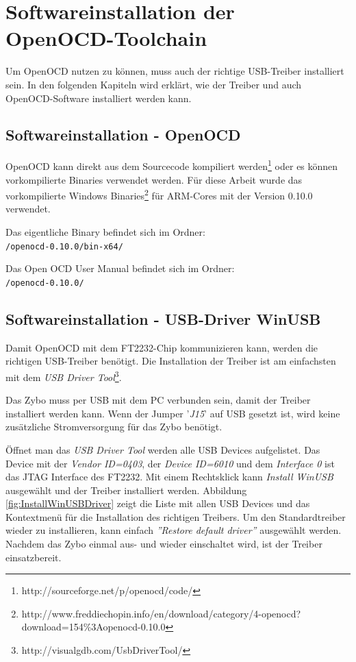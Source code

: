 \section{Softwareinstallation der OpenOCD-Toolchain}
\label{kapitel:SoftwareinstallationOpenOCDToolchain}
Um OpenOCD nutzen zu können, muss auch der richtige USB-Treiber installiert sein.
In den folgenden Kapiteln wird erklärt, wie der Treiber und auch OpenOCD-Software installiert werden kann.


\subsection{Softwareinstallation - OpenOCD}
OpenOCD kann direkt aus dem Sourcecode kompiliert werden\footnote{http://sourceforge.net/p/openocd/code/} oder es können vorkompilierte Binaries verwendet werden.
Für diese Arbeit wurde das vorkompilierte Windows Binaries\footnote{http://www.freddiechopin.info/en/download/category/4-openocd?download=154\%3Aopenocd-0.10.0} für ARM-Cores mit der Version 0.10.0 verwendet.

Das eigentliche Binary befindet sich im Ordner:\\
\texttt{/openocd-0.10.0/bin-x64/} 

Das Open OCD User Manual\cite{bib:OpenOCDDoku} befindet sich im Ordner:\\
\texttt{/openocd-0.10.0/} 


\subsection{Softwareinstallation - USB-Driver WinUSB}
\label{kapitel:usbTreiber}
Damit OpenOCD mit dem FT2232-Chip kommunizieren kann, werden die richtigen USB-Treiber benötigt.
Die Installation der Treiber ist am einfachsten mit dem \textit{USB Driver Tool}\footnote{http://visualgdb.com/UsbDriverTool/}.

Das Zybo muss per USB mit dem PC verbunden sein, damit der Treiber installiert werden kann.
Wenn der Jumper '\textit{J15}' auf USB gesetzt ist, wird keine zusätzliche Stromversorgung für das Zybo benötigt.

Öffnet man das \textit{USB Driver Tool} werden alle USB Devices aufgelistet.
Das Device mit der \textit{Vendor ID=0403}, der \textit{Device ID=6010} und dem \textit{Interface 0} ist das JTAG Interface des FT2232.
Mit einem Rechtsklick kann \textit{Install WinUSB} ausgewählt und der Treiber installiert werden.
Abbildung \ref{fig:InstallWinUSBDriver} zeigt die Liste mit allen USB Devices und das Kontextmenü für die Installation des richtigen Treibers.
Um den Standardtreiber wieder zu installieren, kann einfach \textit{''Restore default driver''} ausgewählt werden.
Nachdem das Zybo einmal aus- und wieder einschaltet wird, ist der Treiber einsatzbereit.

